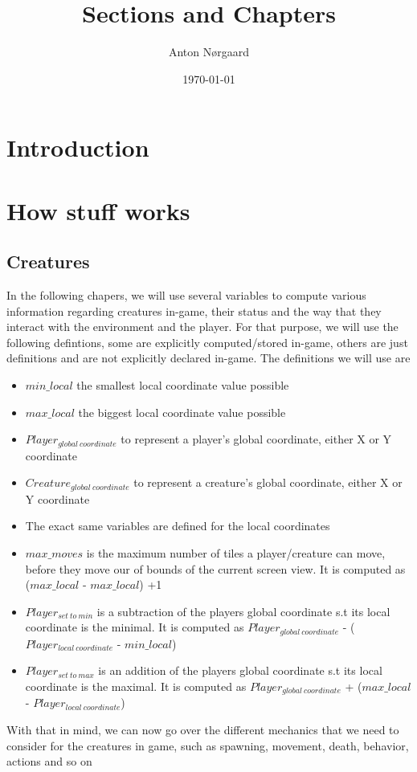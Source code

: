 \documentclass{article}
\title{Sections and Chapters}
\author{Anton Nørgaard}
\date{ \today}
\begin{document}
  
\maketitle
  
\tableofcontents

\section{Introduction}
   
\section{How stuff works}
\subsection{Creatures}
In the following chapers, we will use several variables to compute various information regarding creatures in-game, their status and the way
that they interact with the environment and the player. For that purpose, we will use the following defintions, some are explicitly computed/stored in-game, others are just definitions and are not explicitly declared in-game. The definitions we will use are
\begin{itemize}
\item $min\_local$ the smallest local coordinate value possible 
\item $max\_local$ the biggest local coordinate value possible 
\item $Player_{global  \:coordinate}$  to represent a player's global coordinate, either X or Y coordinate 
\item $Creature_{global \: coordinate}$ to represent a creature's global coordinate, either X or Y coordinate 
\item The exact same variables are defined for the local coordinates 
\item $max\_moves$ is the maximum number of tiles a player/creature can move, before they move our of bounds of the current screen view. It is computed as  ($max\_local$ - $max\_local$) +1 
\item $Player_{set \: to \: min}$  is a subtraction of the players global coordinate s.t its local coordinate is the minimal. It is computed as  $Player_{global \: coordinate}$ - ($Player_{local \: coordinate}$ - $min\_local$)
\item $Player_{set \: to \: max}$  is an addition of the players global coordinate s.t its local coordinate is the maximal. It is computed as  $Player_{global \: coordinate}$ + ($max\_local$ - $Player_{local \: coordinate}$)
\end{itemize}
With that in mind, we can now go over the different mechanics that we need to consider for the creatures in game, such as spawning, movement, death, behavior, actions and so on
\end{document}
